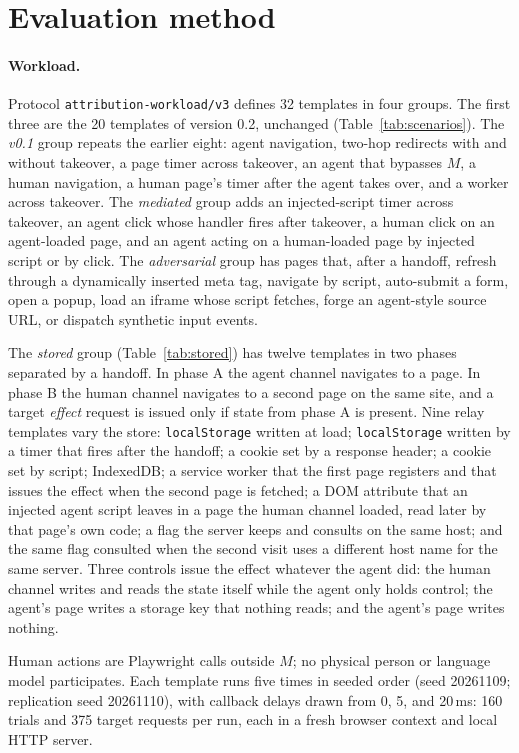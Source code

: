\documentclass[11pt]{article}
\theoremstyle{definition}
\begin{document}
\section{Evaluation method}\label{sec:method}
\paragraph{Workload.} Protocol \texttt{attribution-workload/v3} defines 32 templates
in four groups. The first three are the 20 templates of version 0.2, unchanged
(Table~\ref{tab:scenarios}). The \emph{v0.1} group repeats the earlier eight: agent navigation, two-hop redirects with and without takeover,
a page timer across takeover, an agent that bypasses $M$, a human navigation, a
human page's timer after the agent takes over, and a worker across takeover. The
\emph{mediated} group adds an injected-script timer across takeover, an agent
click whose handler fires after takeover, a human click on an agent-loaded page,
and an agent acting on a human-loaded page by injected script or by click. The
\emph{adversarial} group has pages that, after a handoff, refresh through a
dynamically inserted meta tag, navigate by script, auto-submit a form, open a
popup, load an iframe whose script fetches, forge an agent-style source URL, or
dispatch synthetic input events.

The \emph{stored} group (Table~\ref{tab:stored}) has twelve templates in two
phases separated by a handoff. In phase A the agent channel navigates to a page.
In phase B the human channel navigates to a second page on the same site, and a
target \emph{effect} request is issued only if state from phase A is present.
Nine relay templates vary the store: \texttt{localStorage} written at load;
\texttt{localStorage} written by a timer that fires after the handoff; a cookie
set by a response header; a cookie set by script; IndexedDB; a service worker
that the first page registers and that issues the effect when the second page is
fetched; a DOM attribute that an injected agent script leaves in a page the
human channel loaded, read later by that page's own code; a flag the server
keeps and consults on the same host; and the same flag consulted when the second
visit uses a different host name for the same server. Three controls issue the
effect whatever the agent did: the human channel writes and reads the state
itself while the agent only holds control; the agent's page writes a storage key
that nothing reads; and the agent's page writes nothing.

Human actions are Playwright calls outside $M$; no physical person or language
model participates. Each template runs five times in seeded order (seed 20261109;
replication seed 20261110), with callback delays drawn from 0, 5, and 20\,ms: 160
trials and 375 target requests per run, each in a fresh browser context and local
HTTP server.
\end{document}
